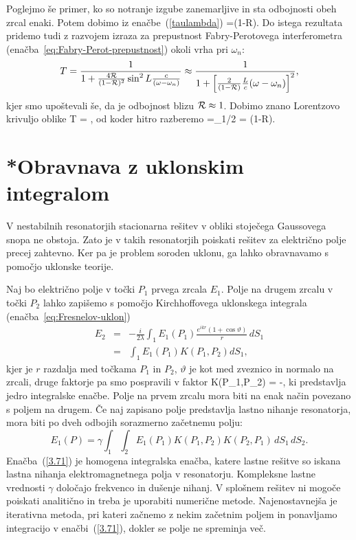 Poglejmo še primer, ko so notranje izgube zanemarljive in sta odbojnosti obeh zrcal enaki.
Potem dobimo iz enačbe~(\ref{taulambda})
\beq
{}=(1-{\cal R}).
\eeq
Do istega rezultata pridemo tudi z razvojem izraza za prepustnost Fabry-Perotovega 
interferometra (enačba~\ref{eq:Fabry-Perot-prepustnost})
okoli vrha pri $\omega_{n}$:
\begin{equation}
T=\frac{1}{1+\frac{4{\cal R}}{(1-{\cal R})^{2}}\sin^{2}L\frac{c}{(\omega-\omega_{n})}}\approx 
\frac{1}{1+\left[\frac{2}{(1-{\cal R})}\frac{L}{c}(\omega-\omega_{n})\right]^{2}},
\label{3.27}
\end{equation}
 kjer smo upoštevali še, da je odbojnost blizu ${\cal R} \approx 1$. Dobimo znano Lorentzovo
 krivuljo oblike
 \beq
 T = ,
 \eeq
od koder hitro razberemo 
\beq
{}=\Delta\omega_{1/2} = (1-{\cal R}).
\eeq

\section{*Obravnava z uklonskim integralom}
\label{Resonator_uklon}

V nestabilnih resonatorjih stacionarna rešitev v obliki stoječega
Gaussovega snopa ne obstoja. Zato je v takih resonatorjih poiskati 
rešitev za električno polje precej zahtevno. 
Ker pa je problem soroden uklonu, ga lahko obravnavamo s pomočjo 
uklonske teorije.

Naj bo električno polje v točki $P_{1}$ prvega zrcala $E_{1}$.
Polje na drugem zrcalu v točki $P_2$ lahko zapišemo s pomočjo Kirchhoffovega uklonskega
integrala (enačba~\ref{eq:Fresnelov-uklon})
\begin{eqnarray}
E_{2} & = & -\frac{i}{2\lambda}\int_{1}E_{1}(P_{1})\frac{e^{ikr}(1+\cos\vartheta)}{r}\, dS_{1} \\
 & = & \int_{1}E_{1}(P_{1})K(P_{1},P_{2})dS_{1},
\label{eq:resuklon}
\end{eqnarray}
kjer je $r$ razdalja med točkama $P_{1}$ in $P_{2}$, $\vartheta$
je kot med zveznico in normalo na zrcali, druge faktorje pa smo pospravili v faktor
\beq
K(P_{1},P_{2}) = -,
\label{jedro}
\eeq
ki predstavlja jedro integralske enačbe. Polje na prvem zrcalu mora
biti na enak način povezano s poljem na drugem. Če naj zapisano polje predstavlja lastno nihanje
resonatorja, mora biti po dveh odbojih sorazmerno začetnemu polju:
\begin{equation}
E_{1}(P)=\gamma\int_{1}\int_{2}E_{1}(P_{1})K(P_{1},P_{2})K(P_{2},P_1)\, dS_{1}\, dS_{2}.
\label{3.71}
\end{equation}
Enačba~(\ref{3.71}) je homogena integralska enačba, katere lastne
rešitve so iskana lastna nihanja elektromagnetnega polja v resonatorju.
Kompleksne lastne vrednosti $\gamma$ določajo frekvenco in dušenje
nihanj. V splošnem rešitev ni mogoče poiskati analitično in treba je uporabiti 
numerične metode. Najenostavnejša je iterativna
metoda, pri kateri začnemo z nekim začetnim poljem in ponavljamo integracijo
v enačbi~(\ref{3.71}), dokler se polje ne spreminja več.


